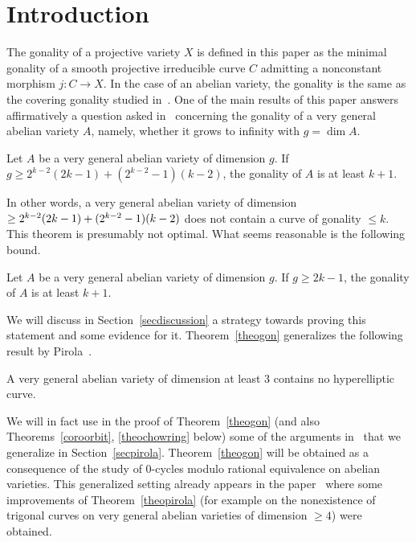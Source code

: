 \section{Introduction}

The gonality of a projective variety $X$ is defined in this paper as the minimal gonality of a smooth projective irreducible curve $C$ admitting a nonconstant morphism $j:C\rightarrow X$. In the case of an abelian variety, the gonality is the same as the covering gonality studied in~\cite{lazarsfeld}. One of the main results of this paper answers affirmatively a question asked in~\cite{lazarsfeld} concerning the gonality of a very general abelian variety $A$, namely, whether it grows to infinity with $g=\dim A$.

\begin{theo} \label{theogon}
Let $A$ be a very general abelian variety of dimension $g$. If $g\geq 2^{k-2}(2k-1)+(2^{k-2}-1)(k-2)$, the gonality of $A$ is at least $k+1$.
\end{theo}

In other words, a very general abelian variety of dimension $\geq 2^{k-2}(2k-1)+\linebreak
(2^{k-2}-1)(k-2)$ does not contain a curve of gonality $\leq k$. This theorem is presumably not optimal. What seems reasonable is the following bound.

\begin{conj}\label{conj}
Let $A$ be a very general abelian variety of dimension $g$.
If $g\geq 2k-1$, the gonality of $A$ is at least $k+1$.
\end{conj}

We will discuss in Section~\ref{secdiscussion} a strategy towards proving this statement and some evidence for it. Theorem~\ref{theogon} generalizes the following result by Pirola~\cite{pirola}.

\begin{theo}[Pirola]\label{theopirola}
A very general abelian variety of dimension at least $3$ contains no hyperelliptic curve.
\end{theo}

We will in fact use in the proof of Theorem~\ref{theogon} (and also Theorems~\ref{coroorbit}, \ref{theochowring} below) some of the arguments in~\cite{pirola} that we generalize in Section~\ref{secpirola}. Theorem~\ref{theogon} will be obtained as a consequence of the study of $0$-cycles modulo rational equivalence on abelian varieties. This generalized setting already appears in the paper~\cite{alzatipirola} where some improvements of Theorem~\ref{theopirola} (for example on the nonexistence of trigonal curves on very general abelian varieties of dimension $\geq 4$) were obtained.

